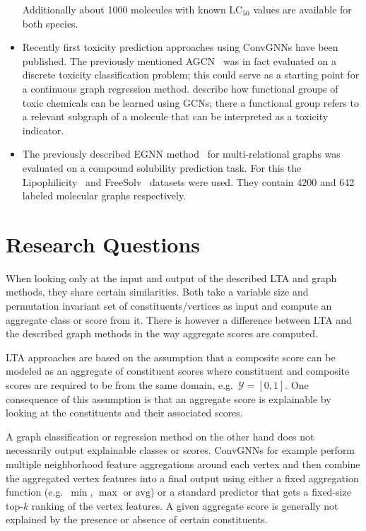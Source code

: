 \documentclass[12pt]{scrartcl}
\begin{document}
\begin{itemize}
		Additionally about 1000 molecules with known $\text{LC}_{50}$ values are available for both species.
	\item Recently first toxicity prediction approaches using ConvGNNs have been published.
		The previously mentioned AGCN~\cite{Li2018} was in fact evaluated on a discrete toxicity classification problem;
		this could serve as a starting point for a continuous graph regression method.
		\citet{Pope2018} describe how functional groups of toxic chemicals can be learned using GCNs;
		there a functional group refers to a relevant subgraph of a molecule that can be interpreted as a toxicity indicator.
	\item The previously described EGNN method~\cite{Gong2018} for multi-relational graphs was evaluated on a compound solubility prediction task.
		For this the Lipophil\-icity~\cite{Wu2017} and FreeSolv~\cite{Mobley2014} datasets were used.
		They contain 4200 and 642 labeled molecular graphs respectively.
\end{itemize}

\section{Research Questions}%
\label{sec:question}

When looking only at the input and output of the described LTA and graph methods, they share certain similarities.
Both take a variable size and permutation invariant set of constituents/vertices as input and compute an aggregate class or score from it.
There is however a difference between LTA and the described graph methods in the way aggregate scores are computed.

LTA approaches are based on the assumption that a composite score can be modeled as an aggregate of constituent scores where constituent and composite scores are required to be from the same domain, e.g.\ $\mathcal{Y} = [0, 1]$.
One consequence of this assumption is that an aggregate score is explainable by looking at the constituents and their associated scores.

A graph classification or regression method on the other hand does not necessarily output explainable classes or scores.
ConvGNNs for example perform multiple neighborhood feature aggregations around each vertex and then combine the aggregated vertex features into a final output using either a fixed aggregation function (e.g.\ $\min$, $\max$ or $\text{avg}$) or a standard predictor that gets a fixed-size top-$k$ ranking of the vertex features.
A given aggregate score is generally not explained by the presence or absence of certain constituents.
\end{document}
